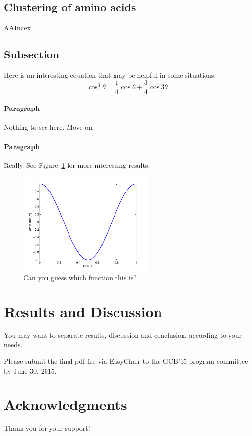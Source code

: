 \documentclass[fleqn,10pt,twoside]{gcb15submission}
\begin{document}
\subsection*{Clustering of amino acids}

AAIndex


\subsection*{Subsection}

Here is an interesting equation that may be helpful in some situations:
\begin{equation}
\cos^3 \theta =\frac{1}{4}\cos\theta+\frac{3}{4}\cos 3\theta
\label{eq:refname2}
\end{equation}

\paragraph{Paragraph}
Nothing to see here. Move on.

\paragraph{Paragraph}
Really.
See Figure~\ref{fig:results} for more interesting results.

\begin{figure}[ht]\centering
\includegraphics[width=0.6\textwidth]{results}
\caption{Can you guess which function this is?}
\label{fig:results}
\end{figure}



\section*{Results and Discussion}

You may want to separate results, discussion and conclusion, according to your needs.

Please submit the final pdf file via EasyChair to the GCB'15 program committee by June 30, 2015. 


\section*{Acknowledgments}
Thank you for your support!



\end{document}
